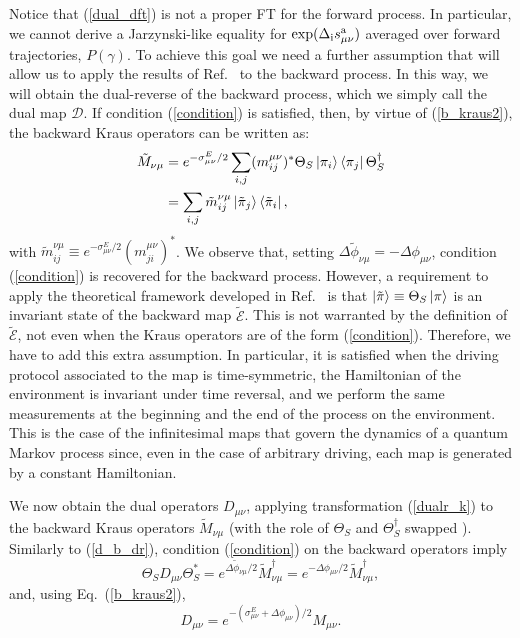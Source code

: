 \documentclass[aps,prx,twocolumn,showpacs,floatfix,superscriptaddress,graphics,longbibliography]{revtex4-1}
\newcommand{\E}{{\mathcal E}}
\newcommand{\D}{{\mathcal D}}
\newcommand{\HAT}{}
\begin{document}
Notice that (\ref{dual_dft}) is not a proper FT for the forward process. In particular, we cannot derive a Jarzynski-like equality for $\exp(\Delta_{\rm i} s^{\rm a}_{\mu \nu})$ averaged over forward trajectories, $P(\gamma)$. 
To achieve this goal we need a further assumption that will allow us to apply the results of Ref.~\cite{MHP} to the backward process. 
In this way, we will obtain the dual-reverse of the backward process, which we simply call the dual map $\D$. If condition (\ref{condition}) is satisfied, then, by virtue of (\ref{b_kraus2}), the backward Kraus operators can be written as:
\begin{align}
 \HAT{\tilde{M}}_{\nu \mu} & = e^{-\sigma^E_{\mu\nu}/2}  \sum_{i, j} (m_{i j}^{\mu \nu})^\ast \Theta_S\ket{\pi_i} \bra{\pi_j}\Theta_S^\dagger \nonumber \\
& =  \sum_{i, j} \tilde m_{i j}^{\nu \mu} \ket{\tilde\pi_j} \bra{\tilde\pi_i}, 
\end{align}
with $\tilde m_{ij}^{\nu\mu}\equiv e^{-\sigma^E_{\mu\nu}/2}(m_{ji}^{\mu \nu})^\ast$. 
We observe that, setting $\Delta\tilde \phi_{\nu\mu}= -\Delta\phi_{\mu\nu}$, condition (\ref{condition}) is recovered for the backward process. 
However, a requirement to apply the theoretical framework developed in Ref.~\cite{MHP} is that $\ket{\tilde\pi}\equiv\Theta_S\ket{\pi}$ is an invariant state of the backward map $\tilde\E$. 
This is not warranted by the definition of $\tilde\E$, not even when the Kraus operators are of the form  (\ref{condition}). 
Therefore, we have to add this extra assumption.  
In particular, it is satisfied when the driving protocol associated to the map is time-symmetric, the Hamiltonian of the environment is invariant under time reversal, and we perform the same 
measurements at the beginning and the end of the process on the environment. This is the case of the infinitesimal maps that govern the dynamics of a quantum Markov process since, even in the case of arbitrary driving, each map is generated by a constant Hamiltonian.

We now obtain the dual operators $D_{\mu\nu}$, applying transformation (\ref{dualr_k}) to the backward Kraus operators $\tilde M_{\nu\mu}$ (with the role of $\Theta_S$ and $\Theta_S^\dagger$ swapped \cite{MHP}). 
Similarly to (\ref{d_b_dr}), condition (\ref{condition}) on the backward operators imply
 \begin{equation}\label{d_b_dr2}
\HAT\Theta_S \HAT{{D}}_{\mu \nu} \HAT\Theta^*_S = e^{\Delta \tilde\phi_{\nu \mu} /2}  \HAT{\tilde M}_{\nu \mu}^\dagger 
 = e^{-\Delta \phi_{\mu \nu} /2}  \HAT{\tilde M}_{\nu \mu}^\dagger , 
\end{equation}
and, using Eq.~(\ref{b_kraus2}),
\begin{equation}
\label{dual_k2}
D_{\mu \nu}= e^{-(\sigma^E_{\mu\nu}+\Delta \phi_{\mu \nu})/2}  \HAT{ M}_{\mu \nu}.
\end{equation}
 
\end{document}
